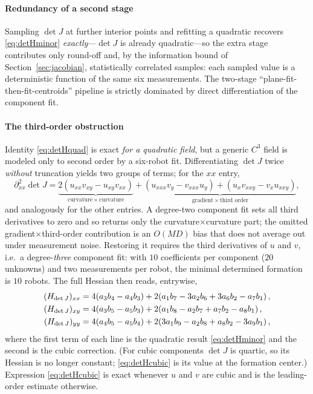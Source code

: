 \documentclass[journal]{IEEEtran}
\begin{document}
\paragraph{Redundancy of a second stage}
Sampling $\det J$ at further interior points and refitting a quadratic recovers
\eqref{eq:detHminor} \emph{exactly}---$\det J$ is already quadratic---so the extra
stage contributes only round-off and, by the information bound of
Section~\ref{sec:jacobian}, statistically correlated samples: each sampled value is
a deterministic function of the same six measurements. The two-stage
``plane-fit-then-fit-centroids'' pipeline is strictly dominated by direct
differentiation of the component fit.

\paragraph{The third-order obstruction}
Identity \eqref{eq:detHquad} is exact \emph{for a quadratic field}, but a generic
$C^{3}$ field is modeled only to second order by a six-robot fit. Differentiating
$\det J$ twice \emph{without} truncation yields two groups of terms; for the
$xx$ entry,
\begin{equation}
\label{eq:obstruction}
\partial^{2}_{xx}\!\det J=
\underbrace{2\!\left(u_{xx}v_{xy}-u_{xy}v_{xx}\right)}_{\text{curvature}\,\times\,\text{curvature}}
+\underbrace{\left(u_{xxx}v_{y}-v_{xxx}u_{y}\right)+\left(u_{x}v_{xxy}-v_{x}u_{xxy}\right)}_{\text{gradient}\,\times\,\text{third order}},
\end{equation}
and analogously for the other entries. A degree-two component fit sets all third
derivatives to zero and so returns only the curvature$\times$curvature part; the
omitted gradient$\times$third-order contribution is an $O(MD)$ bias that does not
average out under measurement noise. Restoring it requires the third derivatives of
$u$ and $v$, i.e.\ a degree-\emph{three} component fit: with $10$ coefficients per
component ($20$ unknowns) and two measurements per robot, the minimal determined
formation is $10$ robots. The full Hessian then reads, entrywise,
\begin{align}
\label{eq:detHcubic}
(H_{\det J})_{xx}&=4\!\left(a_{3}b_{4}-a_{4}b_{3}\right)
+2\!\left(a_{1}b_{7}-3a_{2}b_{6}+3a_{6}b_{2}-a_{7}b_{1}\right),\\
(H_{\det J})_{xy}&=4\!\left(a_{3}b_{5}-a_{5}b_{3}\right)
+2\!\left(a_{1}b_{8}-a_{2}b_{7}+a_{7}b_{2}-a_{8}b_{1}\right),\notag\\
(H_{\det J})_{yy}&=4\!\left(a_{4}b_{5}-a_{5}b_{4}\right)
+2\!\left(3a_{1}b_{9}-a_{2}b_{8}+a_{8}b_{2}-3a_{9}b_{1}\right),\notag
\end{align}
where the first term of each line is the quadratic result \eqref{eq:detHminor} and
the second is the cubic correction. (For cubic components $\det J$ is quartic, so
its Hessian is no longer constant; \eqref{eq:detHcubic} is its value at the
formation center.) Expression \eqref{eq:detHcubic} is exact whenever $u$ and $v$
are cubic and is the leading-order estimate otherwise.
\end{document}

